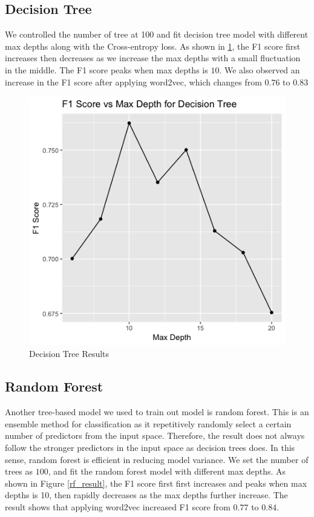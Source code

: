 \documentclass[letterpaper, 12 pt, conference]{ieeeconf}  %
\begin{document}
\subsection{Decision Tree}
We controlled the number of tree at 100 and fit decision tree model with different max depths along with the Cross-entropy loss. As shown in \ref{dt_results}, the F1 score first increases then decreases as we increase the max depths with a small fluctuation in the middle. The F1 score peaks when max depths is $10$. We also observed an increase in the F1 score after applying word2vec, which changes from $0.76$ to $0.83$ 
\begin{figure}[h]
	\centering
	\includegraphics[scale=0.4]	
    {dt_result.png}
	\caption{Decision Tree Results}
    \label{dt_results}
\end{figure}

\subsection{Random Forest}
Another tree-based model we used to train out model is random forest. This is an ensemble method for classification as it repetitively randomly select a certain number of predictors from the input space. Therefore, the result does not always follow the stronger predictors in the input space as decision trees does. In this sense, random forest is efficient in reducing model variance. We set the number of trees as $100$, and fit the random forest model with different max depths. As shown in Figure \ref{rf_result}, the F1 score first first increases and peaks when max depths is 10, then rapidly decreases as the max depths further increase. The result shows that applying word2vec increased F1 score from $0.77$ to $0.84$.
\end{document}
